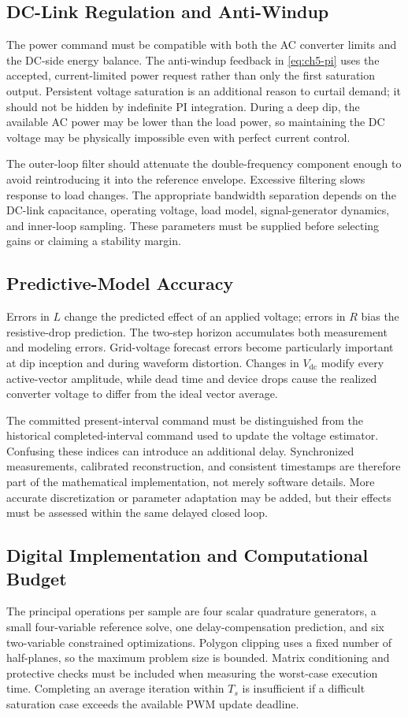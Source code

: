 \subsection{DC-Link Regulation and Anti-Windup}
The power command must be compatible with both the AC converter limits and the DC-side energy balance. The anti-windup feedback in \eqref{eq:ch5-pi} uses the accepted, current-limited power request rather than only the first saturation output. Persistent voltage saturation is an additional reason to curtail demand; it should not be hidden by indefinite PI integration. During a deep dip, the available AC power may be lower than the load power, so maintaining the DC voltage may be physically impossible even with perfect current control.

The outer-loop filter should attenuate the double-frequency component enough to avoid reintroducing it into the reference envelope. Excessive filtering slows response to load changes. The appropriate bandwidth separation depends on the DC-link capacitance, operating voltage, load model, signal-generator dynamics, and inner-loop sampling. These parameters must be supplied before selecting gains or claiming a stability margin.

\subsection{Predictive-Model Accuracy}
Errors in $L$ change the predicted effect of an applied voltage; errors in $R$ bias the resistive-drop prediction. The two-step horizon accumulates both measurement and modeling errors. Grid-voltage forecast errors become particularly important at dip inception and during waveform distortion. Changes in $V_{\mathrm{dc}}$ modify every active-vector amplitude, while dead time and device drops cause the realized converter voltage to differ from the ideal vector average.

The committed present-interval command must be distinguished from the historical completed-interval command used to update the voltage estimator. Confusing these indices can introduce an additional delay. Synchronized measurements, calibrated reconstruction, and consistent timestamps are therefore part of the mathematical implementation, not merely software details. More accurate discretization or parameter adaptation may be added, but their effects must be assessed within the same delayed closed loop.

\subsection{Digital Implementation and Computational Budget}
The principal operations per sample are four scalar quadrature generators, a small four-variable reference solve, one delay-compensation prediction, and six two-variable constrained optimizations. Polygon clipping uses a fixed number of half-planes, so the maximum problem size is bounded. Matrix conditioning and protective checks must be included when measuring the worst-case execution time. Completing an average iteration within $T_s$ is insufficient if a difficult saturation case exceeds the available PWM update deadline.

